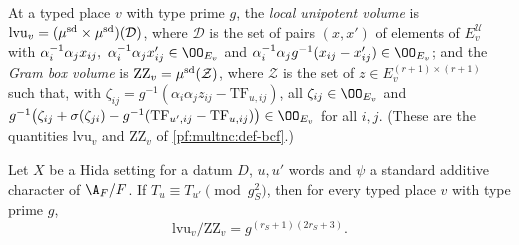 \begin{definition}\label{pf:sh-siegel:locvoldef}
At a typed place $v$ with type prime $g$, the \emph{local unipotent volume} is
$\mathrm{lvu}_v=(\mu^{\mathrm{sd}}\times\mu^{\mathrm{sd}})(\mathcal D)$, where $\mathcal D$ is the set of pairs $(x,x')$ of elements of
$E_v^{\mathcal U}$ with $\alpha_i^{-1}\alpha_jx_{ij},\ \alpha_i^{-1}\alpha_jx'_{ij}\in\OO_{E_v}$ and
$\alpha_i^{-1}\alpha_jg^{-1}(x_{ij}-x'_{ij})\in\OO_{E_v}$; and the \emph{Gram box volume} is $\mathrm{ZZ}_v=\mu^{\mathrm{sd}}(\mathcal
Z)$, where $\mathcal Z$ is the set of $z\in E_v^{(r+1)\times(r+1)}$ such that, with $\zeta_{ij}=g^{-1}(\alpha_i\alpha_jz_{ij}-
\mathrm{TF}_{u,ij})$, all $\zeta_{ij}\in\OO_{E_v}$ and $g^{-1}\bigl(\zeta_{ij}+\sigma(\zeta_{ji})-g^{-1}(\mathrm{TF}_{u',ij}-
\mathrm{TF}_{u,ij})\bigr)\in\OO_{E_v}$ for all $i,j$. (These are the quantities $\mathrm{lvu}_v$ and $\mathrm{ZZ}_v$ of
\cref{pf:multnc:def-bcf}.)
\ 
\end{definition}

\begin{theorem}\label{pf:sh-siegel:voltyp}
Let $X$ be a Hida setting for a datum $D$, $u,u'$ words and $\psi$ a standard additive character of $\A_F/F$. If
$T_u\equiv T_{u'}\pmod{g_S^2}$, then for every typed place $v$ with type prime $g$,
\[
\mathrm{lvu}_v/\mathrm{ZZ}_v=g^{(r_S+1)(2r_S+3)} .
\]
\end{theorem}

